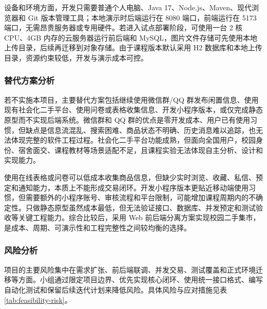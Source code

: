 ﻿\documentclass[UTF8,a4paper,12pt]{ctexart}
\begin{document}
设备和环境方面，开发只需要普通个人电脑、Java 17、Node.js、Maven、现代浏览器和 Git 版本管理工具；本地演示时后端运行在 8080 端口，前端运行在 5173 端口，无需昂贵服务器或专用硬件。若进入试点部署阶段，可使用一台 2 核 CPU、4GB 内存的云服务器运行前后端和 MySQL，图片文件存储可先使用本地上传目录，后续再迁移到对象存储。由于课程版本默认采用 H2 数据库和本地上传目录，资源约束较低，开发与演示成本可控。

\subsubsection{替代方案分析}
若不实施本项目，主要替代方案包括继续使用微信群/QQ 群发布闲置信息、使用现有社会化二手平台、使用问卷或表格收集信息、开发小程序版本，或仅完成静态原型而不实现后端系统。微信群和 QQ 群的优点是零开发成本、用户已有使用习惯，但缺点是信息流混乱、搜索困难、商品状态不明确、历史消息难以追踪，也无法体现完整的软件工程过程。社会化二手平台功能成熟，但面向全国用户，校园身份、宿舍面交、课程教材等场景适配不足，且课程实验无法体现自主分析、设计和实现能力。

使用在线表格或问卷可以低成本收集商品信息，但缺少实时浏览、收藏、私信、预定和通知能力，本质上不能形成交易闭环。开发小程序版本更贴近移动端使用习惯，但需要额外的小程序账号、审核流程和平台限制，可能增加课程周期内的不确定性。只做静态原型虽然成本最低，但无法验证接口、数据库、并发预定和测试验收等关键工程能力。综合比较后，采用 Web 前后端分离方案实现校园二手集市，是成本、周期、可演示性和工程完整性之间较均衡的选择。

\subsubsection{风险分析}
项目的主要风险集中在需求扩张、前后端联调、并发交易、测试覆盖和正式环境迁移等方面。小组通过限定项目边界、优先实现核心闭环、使用统一接口格式、编写自动化测试和保留后续迭代计划来降低风险。具体风险与应对措施见表 \ref{tab:feasibility-risk}。
\end{document}

